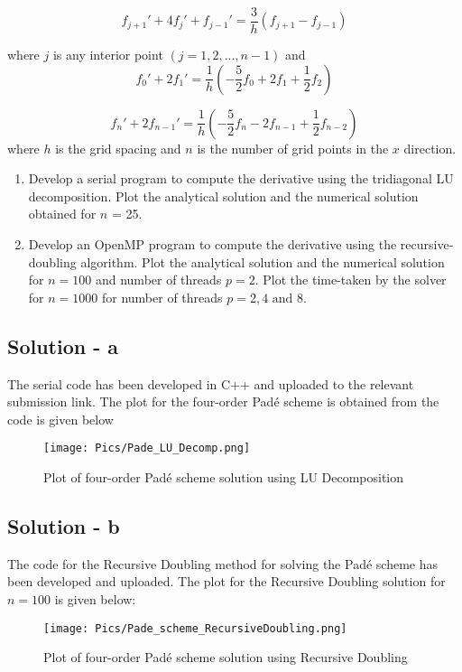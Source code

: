 \documentclass[12pt]{article}
\begin{document}
$$
f_{j+1}'+4f_{j}'+f_{j-1}' = \frac{3}{h}\left(f_{j+1} - f_{j-1}\right)
$$

where $j$ is any interior point $( j = 1, 2, . . . , n - 1)$ and
$$
f_0'+2f_1' = \frac{1}{h}\left( -\frac{5}{2}f_0 + 2f_1 + \frac{1}{2}f_2\right)
$$

$$
f_n'+2f_{n-1}' = \frac{1}{h}\left( -\frac{5}{2}f_n - 2f_{n-1} + \frac{1}{2}f_{n-2}\right)
$$
where $h$ is the grid spacing and $n$ is the number of grid points in the $x$ direction.
\begin{enumerate}[label=\alph*]
    \item Develop a serial program to compute the derivative using the tridiagonal LU decomposition. Plot the analytical solution and the numerical solution obtained for $n$ = 25.
    \item Develop an OpenMP program to compute the derivative using the recursive-doubling algorithm. Plot the analytical solution and the numerical solution for $n = 100$ and number of threads $p = 2$. Plot the time-taken by the solver for $n = 1000$ for number of threads $p = 2, 4 \text{\ and\ } 8$.
\end{enumerate}

\newpage
\subsection*{Solution - a}

The serial code has been developed in C++ and uploaded to the relevant submission link. The plot for the four-order Padé scheme is obtained from the code is given below

\begin{figure}[!ht]
    \centering
    \texttt{[image: Pics/Pade\_LU\_Decomp.png]}
    \caption{Plot of four-order Padé scheme solution using LU Decomposition}
    \label{fig:LUD}
\end{figure}

\subsection*{Solution - b}

\noindent The code for the Recursive Doubling method for solving the Padé scheme has been developed and uploaded. The plot for the Recursive Doubling solution for $n=100$ is given below:

\begin{figure}[!ht]
    \centering
    \texttt{[image: Pics/Pade\_scheme\_RecursiveDoubling.png]}
    \caption{Plot of four-order Padé scheme solution using Recursive Doubling}
    \label{fig:RD}
\end{figure}
\end{document}
